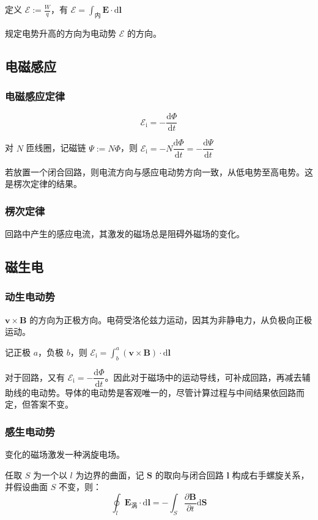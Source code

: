 \documentclass[12pt, a4paper, UTF8, openany]{ctexbook}
\newcommand{\dif}{\mathrm{d}}
\newcommand{\vect}[1]{\mathbf{#1}}
\newcommand{\vecv}{\vect{v}}
\newcommand{\vecl}{\vect{l}}
\newcommand{\vecs}{\vect{S}}
\newcommand{\vece}{\vect{E}}
\newcommand{\vecb}{\vect{B}}
\newcommand{\eforce}{\mathcal{E}}
\newcommand{\cross}{\times}
\begin{document}
        定义 $\eforce := \frac{W}{q}$，有 $\eforce = \int_{\text{内}} \vece \cdot \dif \vecl$

        规定电势升高的方向为电动势 $\eforce$ 的方向。

        \subsection{电磁感应}
        \subsubsection{电磁感应定律}
        $$\eforce_{\text{i}} = -\frac{\dif \Phi}{\dif t}$$

        对 $N$ 匝线圈，记磁链 $\Psi := N\Phi$，则 $\eforce_{\text{i}} = -N \dfrac{\dif \Phi}{\dif t} = - \dfrac{\dif \Psi}{\dif t}$

        若放置一个闭合回路，则电流方向与感应电动势方向一致，从低电势至高电势。这是楞次定律的结果。

        \subsubsection{楞次定律}
        回路中产生的感应电流，其激发的磁场总是阻碍外磁场的变化。

        \subsection{磁生电}
        \subsubsection{动生电动势}
        $\vecv \cross \vecb$ 的方向为正极方向。电荷受洛伦兹力运动，因其为非静电力，从负极向正极运动。

        记正极 $a$，负极 $b$，则 $\eforce_{\text{i}} = \int_{b}^{a} (\vecv \cross \vecb) \cdot \dif \vecl$

        对于回路，又有 $\eforce_{\text{i}} = -\dfrac{\dif \Phi}{\dif t}$。因此对于磁场中的运动导线，可补成回路，再减去辅助线的电动势。导体的电动势是客观唯一的，尽管计算过程与中间结果依回路而定，但答案不变。

        \subsubsection{感生电动势}
        变化的磁场激发一种涡旋电场。

        任取 $S$ 为一个以 $l$ 为边界的曲面，记 $\vecs$ 的取向与闭合回路 $\vecl$ 构成右手螺旋关系，并假设曲面 $S$ 不变，则：
        $$\oint_{l} \vece_{\text{涡}} \cdot \dif\vecl = -\int_{S} \frac{\partial \vecb}{\partial t} \dif \vecs$$
\end{document}
